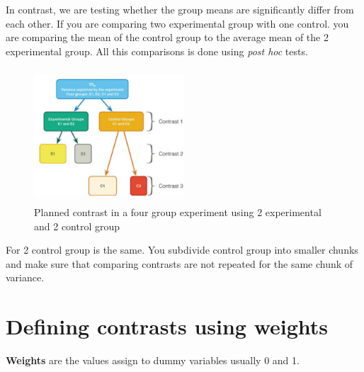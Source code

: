 In contrast, we are testing whether the group means are significantly differ from each other. If you are comparing two experimental group with one control. you are comparing the mean of the control group to the average mean of the 2 experimental group. All this comparisons is done using \emph{post hoc} tests.
\clearpage
\begin{figure}[h]
	\includegraphics[width=0.5\textwidth,height=50mm]{Chapter 12 GLM 1 Comparing Several Independent Means ANOVA/plannedcontrast3.PNG}
	\caption{Planned contrast in a four group experiment using 2 experimental and 2 control group}
\end{figure}

For 2 control group is the same. You subdivide control group into smaller chunks and make sure that comparing contrasts are not repeated for the same chunk of variance. 

\section{Defining contrasts using weights}

\textbf{Weights} are the values assign to dummy variables usually 0 and 1. 

